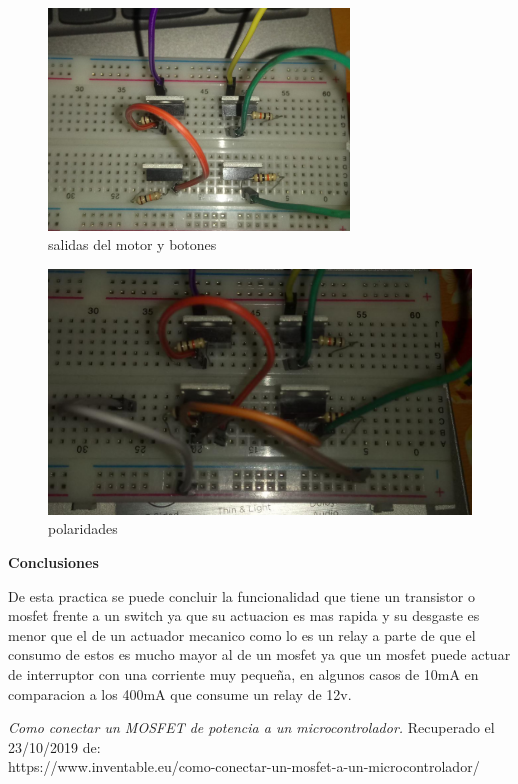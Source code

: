 \documentclass[letterpaper]{article}
\begin{document}
\begin{figure}[htbp]
    \centering
    \includegraphics[width=8cm]{Img/puenteH4.jpeg}
    \caption{salidas del motor y botones}
    \label{fig:my_label}
\end{figure}
\begin{figure}[htbp]
    \centering
    \includegraphics[width=15cm]{Img/puenteH5.jpeg}
    \caption{polaridades}
    \label{fig:my_label1}
\end{figure}
\newpage
\textbf{Conclusiones}\\
\begin{large}
    De esta practica se puede concluir la funcionalidad que tiene un transistor o mosfet frente a un switch ya que su actuacion es mas rapida y su desgaste es menor que el de un actuador mecanico como lo es un relay a parte de que el consumo de estos es mucho mayor al de un mosfet ya que un mosfet puede actuar de interruptor con una corriente muy pequeña, en algunos casos de 10mA en comparacion a los 400mA que consume un relay de 12v.\\
\end{large}
\begin{thebibliography}{}
 \textit{Como conectar un MOSFET de potencia a un microcontrolador.} Recuperado el 23/10/2019 de:\\ https://www.inventable.eu/como-conectar-un-mosfet-a-un-microcontrolador/

\end{thebibliography}
\end{document}
